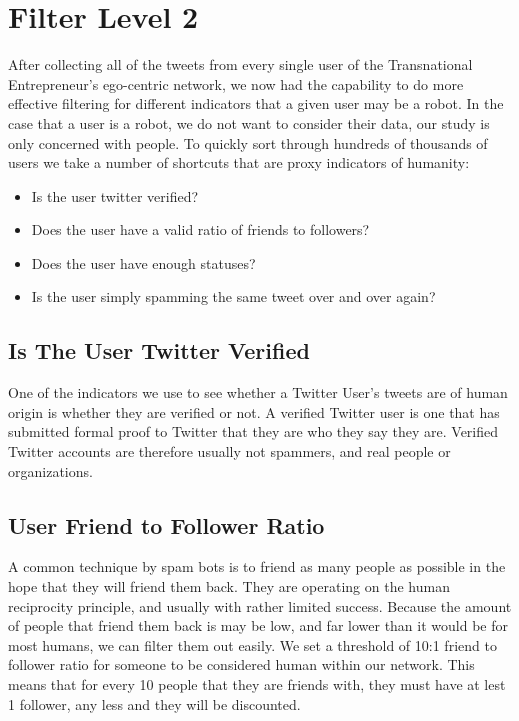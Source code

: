 \section{Filter Level 2}
After collecting all of the tweets from every single user of the
Transnational Entrepreneur's ego-centric network, we now had the
capability to do more effective filtering for different indicators
that a given user may be a robot. In the case that a user is a robot,
we do not want to consider their data, our study is only concerned
with people. To quickly sort through hundreds of thousands of users we
take a number of shortcuts that are proxy indicators of humanity:

\begin{itemize}
\item Is the user twitter verified?
\item Does the user have a valid ratio of friends to followers?
\item Does the user have enough statuses?
\item Is the user simply spamming the same tweet over and over again?
\end{itemize}

\subsection{Is The User Twitter Verified}
One of the indicators we use to see whether a Twitter User's tweets
are of human origin is whether they are verified or not. A verified
Twitter user is one that has submitted formal proof to Twitter that
they are who they say they are. Verified Twitter accounts are
therefore usually not spammers, and real people or organizations.

\subsection{User Friend to Follower Ratio}
A common technique by spam bots is to friend as many people as
possible in the hope that they will friend them back. They are
operating on the human reciprocity principle, and usually with rather
limited success. Because the amount of people that friend them back is
may be low, and far lower than it would be for most humans, we can
filter them out easily. We set a threshold of 10:1 friend to follower
ratio for someone to be considered human within our network. This
means that for every 10 people that they are friends with, they must
have at lest 1 follower, any less and they will be discounted.

